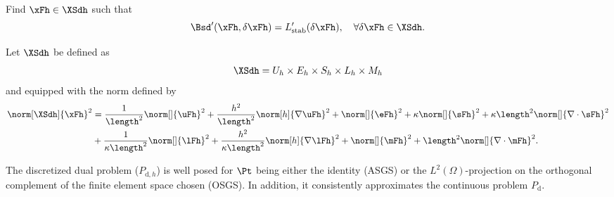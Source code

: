 \begin{problem}[$\Pdh$] Find $\xFh\in\XSdh$ such that
\begin{equation}
\Bsd'(\xFh,\delta\xFh) = L'_{\mathrm{stab}}(\delta\xFh),\quad\forall\delta\xFh\in\XSdh. 
\end{equation} 
\end{problem}

\begin{definition} Let $\XSdh$ be defined as
$$\XSdh =  U_h \times E_h \times S_h \times L_h \times M_h $$
and equipped with the norm defined by
\begin{align*}
\norm[\XSdh]{\xFh}^2 & =
\frac{1}{\length^2}\norm[]{\uFh}^2+
\frac{h^2}{\length^2}\norm[h]{\nabla\uFh}^2+
\norm[]{\eFh}^2+
\kappa\norm[]{\sFh}^2+
\kappa\length^2\norm[]{\nabla\cdot\sFh}^2\\
& + \frac{1}{\kappa\length^2}\norm[]{\lFh}^2+
\frac{h^2}{\kappa\length^2}\norm[h]{\nabla\lFh}^2+
\norm[]{\mFh}^2+
\length^2\norm[]{\nabla\cdot\mFh}^2.
\end{align*}
\end{definition}

\begin{theorem}\label{thm:thm4}
The discretized dual problem ($P_{\mathrm{d},h}$) is well posed for $\Pt$ being either the identity (ASGS) or the $L^2(\Omega)$-projection on the orthogonal complement of the finite element space chosen (OSGS). In addition, it consistently approximates the continuous problem $P_{\mathrm{d}}$.      
\end{theorem}

